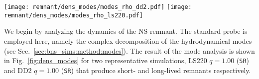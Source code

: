 \begin{figure*}[t]
    \centering 
    \texttt{[image: remnant/dens\_modes/modes\_rho\_dd2.pdf]}
    \texttt{[image: remnant/dens\_modes/modes\_rho\_ls220.pdf]}
    \caption{Modes analysis for exemplary equal-mass long-live and short-lived
        remnants. The evolution of the $m=2$ and the $m=1$ monitored by
        Eq.~\eqref{eq:modes} is shown for the DD2 and LS220 remnant with and
        without turbulent viscosity. The $m=2$ mode in the long-lived
        remnant is strongly damped by the emission of gravitational
        radiation and becomes comparable to the $m=1$ mode on a timescale of
        ${\gtrsim}20\,$ms. Turbulent viscosity sustain the $m=2$ mode for
        a longer period. The $m=2$ mode is instead dominant to collapse in
        the short-lived remnant.
        (Adopted from \cite{Nedora:2020pak}).
    }
    \label{fig:dens_modes}
\end{figure*}

We begin by analyzing the \pmerg{} dynamics of the \ac{NS} remnant. The standard 
probe is employed here, namely the complex decomposition of the hydrodynamical modes
(see Sec.~\ref{sec:bns_sims:method:modes}). 
%
The result of the mode analysis is shown in Fig.~\ref{fig:dens_modes} for two 
representative simulations, 
LS220 $q=1.00$ (\texttt{SR}) %
and 
DD2 $q=1.00$ (\texttt{SR})  
that produce short- and long-lived remnants respectively.

